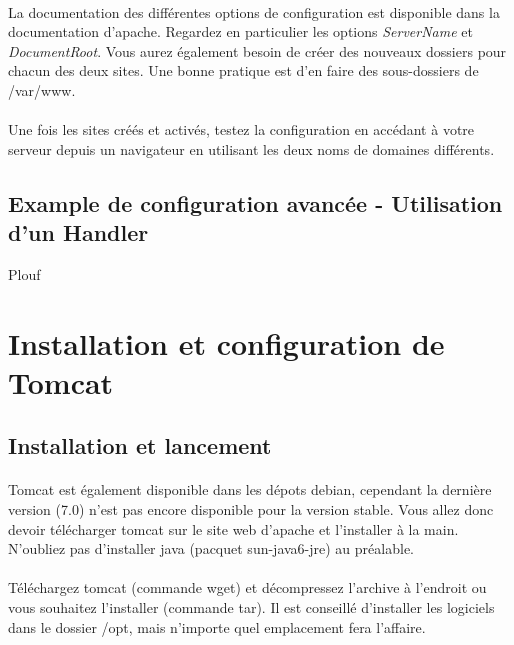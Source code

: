 \documentclass[12pt,a4paper]{article}
\begin{document}
\paragraph{}
La documentation des différentes options de configuration est disponible dans la documentation d'apache. Regardez en particulier les options \textit{ServerName} et \textit{DocumentRoot}. Vous aurez également besoin de créer des nouveaux dossiers pour chacun des deux sites. Une bonne pratique est d'en faire des sous-dossiers de /var/www.

\paragraph{}
Une fois les sites créés et activés, testez la configuration en accédant à votre serveur depuis un navigateur en utilisant les deux noms de domaines différents.

\subsection{Example de configuration avancée - Utilisation d'un Handler}
Plouf

\section{Installation et configuration de Tomcat}

\subsection{Installation et lancement}

\paragraph{}
Tomcat est également disponible dans les dépots debian, cependant la dernière version (7.0) n'est pas encore disponible pour la version stable. Vous allez donc devoir télécharger tomcat sur le site web d'apache et l'installer à la main. N'oubliez pas d'installer java (pacquet sun-java6-jre) au préalable.

\paragraph{}
Téléchargez tomcat (commande wget) et décompressez l'archive à l'endroit ou vous souhaitez l'installer (commande tar). Il est conseillé d'installer les logiciels dans le dossier /opt, mais n'importe quel emplacement fera l'affaire.
\end{document}
